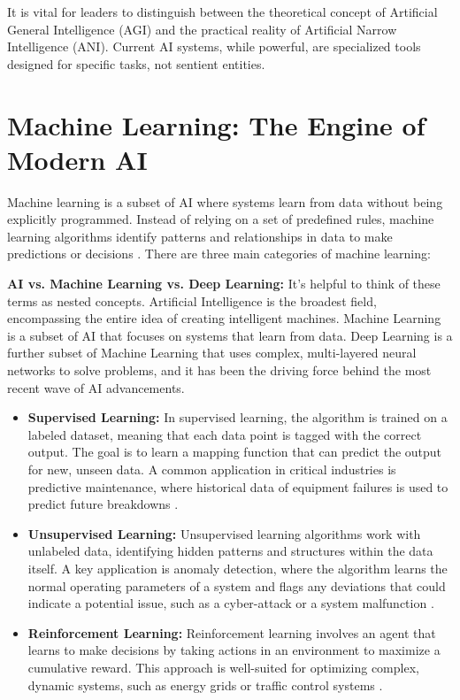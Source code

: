 \begin{notebox}
It is vital for leaders to distinguish between the theoretical concept of Artificial General Intelligence (AGI) and the practical reality of Artificial Narrow Intelligence (ANI). Current AI systems, while powerful, are specialized tools designed for specific tasks, not sentient entities.
\end{notebox}

\section{Machine Learning: The Engine of Modern AI}
\label{sec:machine_learning}
Machine learning is a subset of AI where systems learn from data without being explicitly programmed. Instead of relying on a set of predefined rules, machine learning algorithms identify patterns and relationships in data to make predictions or decisions \parencite{Samuel1959}. There are three main categories of machine learning:

\begin{notebox}
\textbf{AI vs. Machine Learning vs. Deep Learning:} It's helpful to think of these terms as nested concepts. Artificial Intelligence is the broadest field, encompassing the entire idea of creating intelligent machines. Machine Learning is a subset of AI that focuses on systems that learn from data. Deep Learning is a further subset of Machine Learning that uses complex, multi-layered neural networks to solve problems, and it has been the driving force behind the most recent wave of AI advancements.
\end{notebox}

\begin{itemize}
    \item \textbf{Supervised Learning:} In supervised learning, the algorithm is trained on a labeled dataset, meaning that each data point is tagged with the correct output. The goal is to learn a mapping function that can predict the output for new, unseen data. A common application in critical industries is predictive maintenance, where historical data of equipment failures is used to predict future breakdowns \parencite{Sarker2021}.
    \item \textbf{Unsupervised Learning:} Unsupervised learning algorithms work with unlabeled data, identifying hidden patterns and structures within the data itself. A key application is anomaly detection, where the algorithm learns the normal operating parameters of a system and flags any deviations that could indicate a potential issue, such as a cyber-attack or a system malfunction \parencite{Chandola2009}.
    \item \textbf{Reinforcement Learning:} Reinforcement learning involves an agent that learns to make decisions by taking actions in an environment to maximize a cumulative reward. This approach is well-suited for optimizing complex, dynamic systems, such as energy grids or traffic control systems \parencite{SuttonBarto2018}.
\end{itemize}

